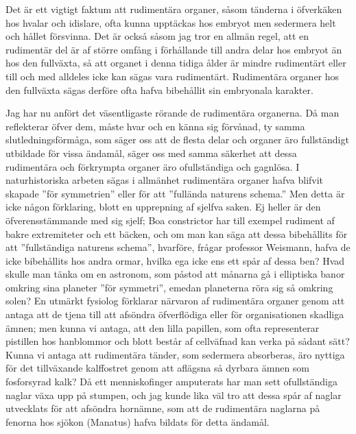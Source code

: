 Det är ett vigtigt faktum att rudimentära organer, såsom tänderna i öfverkäken hos hvalar och idislare, ofta kunna upptäckas hos embryot men sedermera helt och hållet försvinna. Det är också såsom jag tror en allmän regel, att en rudimentär del är af större omfång i förhållande till andra delar hos embryot än hos den fullväxta, så att organet i denna tidiga ålder är mindre rudimentärt eller till och med alldeles icke kan sägas vara rudimentärt. Rudimentära organer hos den fullväxta sägas derföre ofta hafva bibehållit sin embryonala karakter.

Jag har nu anfört det väsentligaste rörande de rudimentära organerna. Då man reflekterar öfver dem, måste hvar och en känna sig förvånad, ty samma slutledningsförmåga, som säger oss att de flesta delar och organer äro fullständigt utbildade för vissa ändamål, säger oss med samma säkerhet att dessa rudimentära och förkrympta organer äro ofullständiga och gagnlösa. I naturhistoriska arbeten sägas i allmänhet rudimentära organer hafva blifvit skapade ”för symmetrien” eller för att ”fullända naturens schema.” Men detta är icke någon förklaring, blott en upprepning af sjelfva saken. Ej heller är den öfverensstämmande med sig sjelf; Boa constrictor har till exempel rudiment af bakre extremiteter och ett bäcken, och om man kan säga att dessa bibehållits för att ”fullständiga naturens schema”, hvarföre, frågar professor Weismann, hafva de icke bibehållits hos andra ormar, hvilka ega icke ens ett spår af dessa ben? Hvad skulle man tänka om en astronom, som påstod att månarna gå i elliptiska banor omkring sina planeter ”för symmetri”, emedan planeterna röra sig så omkring solen? En utmärkt fysiolog förklarar närvaron af rudimentära organer genom att antaga att de tjena till att afsöndra öfverflödiga eller för organisationen skadliga ämnen; men kunna vi antaga, att den lilla papillen, som ofta representerar pistillen hos hanblommor och blott består af cellväfnad kan verka på sådant sätt? Kunna vi antaga att rudimentära tänder, som sedermera absorberas, äro nyttiga för det tillväxande kalffostret genom att aflägsna så dyrbara ämnen som fosforsyrad kalk? Då ett menniskofinger amputerats har man sett ofullständiga naglar växa upp på stumpen, och jag kunde lika väl tro att dessa spår af naglar utvecklats för att afsöndra hornämne, som att de rudimentära naglarna på fenorna hos sjökon (Manatus) hafva bildats för detta ändamål.

